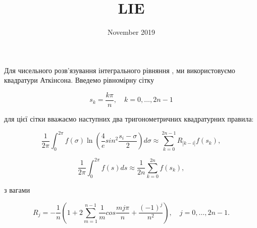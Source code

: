\documentclass{article}
\title{LIE}
\author{}
\date{November 2019}
\begin{document}
Для чисельного розв'язування інтегрального рівняння , ми використовуємо квадратури Аткінсона. Введемо рівномірну сітку

\begin{equation}
    s_k = \frac{k \pi}{n}, \quad k=0, \dots, 2n-1
\end{equation}

для цієї сітки вважаємо наступних два тригонометричних квадратурних правила:

\begin{equation}
\frac{1}{2\pi} \int_{0}^{2\pi} f(\sigma) \ln \left( \frac{4}{e} sin^2 \frac{s_i- \sigma}{2}\right) d\sigma \approx \sum_{k=0}^{2n-1} R_{| k- i |} f(s_k),
\end{equation}

\begin{equation}
    \frac{1}{2\pi} \int_{0}^{2\pi} f(s)ds \approx \frac{1}{2n} \sum_{k=0}^{2n} f(s_k),
\end{equation}

з вагами

\begin{equation*}
    R_j = - \frac{1}{n} \left( 1 + 2 \sum_{m=1}^{n-1}  \frac{1}{m} cos\frac{mj\pi}{n} + \frac{(-1)^j}{n^2}  \right), \quad j=0, \dots, 2n-1.
\end{equation*}
\end{document}
